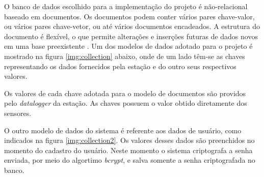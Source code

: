 O banco de dados escolhido para a implementação do projeto é não-relacional baseado em documentos. Os documentos podem conter vários pares chave-valor, ou vários pares chave-vetor, ou até vários documentos encadeados. A estrutura do documento é flexível, o que permite alterações e inserções futuras de dados novos em uma base preexistente \cite{SITEMONGODB}. Um dos modelos de dados adotado para o projeto é mostrado na figura \ref{img:collection} abaixo, onde de um lado têm-se as chaves representando os dados fornecidos pela estação e do outro seus respectivos valores.

Os valores de cada chave adotada para o modelo de documentos são providos pelo \textit{datalogger} da estação. As chaves possuem o valor obtido diretamente dos sensores.


\newpage
{}


O outro modelo de dados do sistema é referente aos dados de usuário, como indicados na figura \ref{img:collection2}. Os valores desses dados são preenchidos no momento do cadastro do usuário. Neste momento o sistema criptografa a senha enviada, por meio do algortimo \textit{bcrypt}, e salva somente a senha criptografada no banco. 

